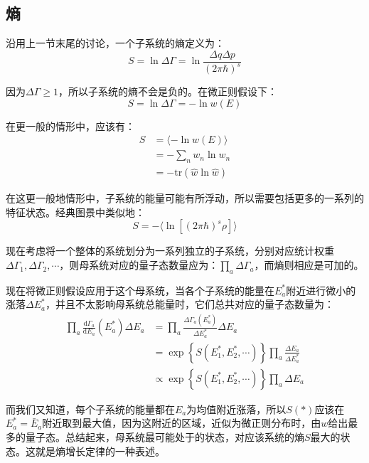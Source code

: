 \documentclass[UTF8]{ctexart}
\begin{document}
\begin{spacing}{2.0}
\subsection{熵}
沿用上一节末尾的讨论，一个子系统的熵定义为：
\begin{equation}
S = \ln \Delta \Gamma=\ln \frac{\Delta q \Delta p}{(2\pi\hbar)^{s}}
\end{equation}

因为$\Delta \Gamma \geq 1$，所以子系统的熵不会是负的。在微正则假设下：
\begin{equation}
S = \ln \Delta \Gamma = -\ln w(E)
\end{equation}

在更一般的情形中，应该有：
\begin{equation}
\begin{aligned}
S &= \langle -\ln w(E) \rangle \\
&= -\sum_{n} w_{n}\ln w_{n} \\
&= -\text{tr}(\hat{w}\ln \hat{w})
\end{aligned}
\end{equation}

在这更一般地情形中，子系统的能量可能有所浮动，所以需要包括更多的一系列的特征状态。经典图景中类似地：
\begin{equation}
S = -\langle \ln \left[ (2\pi\hbar)^{s} \rho  \right] \rangle
\end{equation}

现在考虑将一个整体的系统划分为一系列独立的子系统，分别对应统计权重$\Delta \Gamma_{1},\Delta \Gamma_{2},\cdots$，则母系统对应的量子态数量应为：$\prod_{a}\Delta\Gamma_{a}$，而熵则相应是可加的。

现在将微正则假设应用于这个母系统，当各个子系统的能量在$E_{a}^{*}$附近进行微小的涨落$\Delta E_{a}^{*}$，并且不太影响母系统总能量时，它们总共对应的量子态数量为：
\begin{equation}
\begin{aligned}
\prod_{a}\frac{\text{d}\Gamma_{a}}{\text{d}E_{a}}(E^{*}_{a})\Delta E_{a}&= \prod_{a}\frac{\Delta\Gamma_{a}(E^{*}_{a})}{\Delta E_{a}^{*}}\Delta E_{a}\\
&= \exp\left\{S(E_{1}^{*},E_{2}^{*},\cdots) \right\}\prod_{a}\frac{\Delta E_{a}}{\Delta E^{*}_{a}} \\
&\propto \exp\left\{S(E_{1}^{*},E_{2}^{*},\cdots) \right\}\prod_{a} \Delta E_{a}
\end{aligned}
\end{equation}

而我们又知道，每个子系统的能量都在$E_{a}$为均值附近涨落，所以$S(*)$应该在$E_{a}^{*}=\bar{E}_{a}$附近取到最大值，因为这附近的区域，近似为微正则分布时，由$w$给出最多的量子态。总结起来，母系统最可能处于的状态，对应该系统的熵$S$最大的状态。这就是熵增长定律的一种表述。


\end{spacing}
\end{document}

